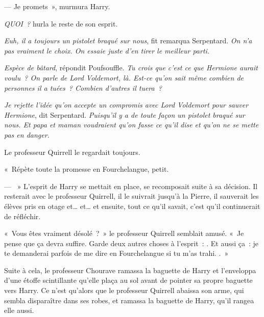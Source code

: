--- Je promets~», murmura Harry.

\emph{QUOI~?} hurla le reste de son esprit.

\emph{Euh, il a toujours un pistolet braqué sur nous}, fit remarqua Serpentard. \emph{On n'a pas vraiment le choix. On essaie juste d'en tirer le meilleur parti.}

\emph{Espèce de bâtard}, répondit Poufsouffle. \emph{Tu crois que c'est ce que Hermione aurait voulu~? On parle de Lord Voldemort, là. Est-ce qu'on sait même combien de personnes il a tuées~? Combien d'autres il tuera~?}

\emph{Je rejette l'idée qu'on accepte un compromis avec Lord Voldemort pour sauver Hermione}, dit Serpentard. \emph{Puisqu'il y a de toute façon un pistolet braqué sur nous. Et papa et maman voudraient qu'on fasse ce qu'il dise et qu'on ne se mette pas en danger.}

Le professeur Quirrell le regardait toujours.

«~Répète toute la promesse en Fourchelangue, petit.

--- ~» L'esprit de Harry se mettait en place, se recomposait suite à sa décision. Il resterait avec le professeur Quirrell, il le suivrait jusqu'à la Pierre, il sauverait les élèves pris en otage et… et… et ensuite, tout ce qu'il savait, c'est qu'il continuerait de réfléchir.

«~Vous êtes vraiment désolé~?~» le professeur Quirrell semblait amusé. «~Je pense que ça devra suffire. Garde deux autres choses à l'esprit~: . Et aussi ça~: je te demanderai parfois de me dire en Fourchelangue si tu m'as trahi. .~»

\later

Suite à cela, le professeur Chourave ramassa la baguette de Harry et l'enveloppa d'une étoffe scintillante qu'elle plaça au sol avant de pointer sa propre baguette vers Harry. Ce n'est qu'alors que le professeur Quirrell abaissa son arme, qui sembla disparaître dans ses robes, et ramassa la baguette de Harry, qu'il rangea elle aussi.

